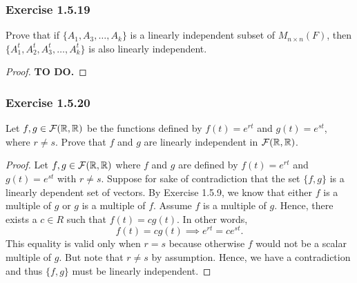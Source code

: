 \subsubsection{Exercise 1.5.19} Prove that if \( \{ A_{1}, A_{3}, \dots, A_{k} \}  \) is a linearly independent subset of \( M_{n \times n }(F) \), then \( \{ A^{t}_{1} , A^{t}_{2} , A^{t}_{3}, \dots, A^{t}_{k } \}  \) is also linearly independent.
\begin{proof}
\textbf{TO DO.}
\end{proof}

\subsubsection{Exercise 1.5.20} Let \( f,g \in \mathcal{F}(\mathbb{R} , \mathbb{R} ) \) be the functions defined by \( f(t) = e^{rt} \) and \( g(t) = e^{s t  } \), where \( r \neq s  \). Prove that \( f  \) and \( g  \) are linearly independent in \( \mathcal{F}(\mathbb{R} , \mathbb{R} ) \).
\begin{proof}
    Let \( f,g \in \mathcal{F}(\mathbb{R} , \mathbb{R} )  \) where \( f  \) and \( g  \) are defined by \( f(t) = e^{rt}  \) and \( g(t) = e^{s t  } \) with \( r \neq  s  \). Suppose for sake of contradiction that the set \( \{ f,g  \}  \) is a linearly dependent set of vectors. By Exercise 1.5.9, we know that either \( f  \) is a multiple of \( g  \) or \( g  \) is a multiple of \( f  \). Assume \( f  \) is a multiple of \( g  \). Hence, there exists a \(  c \in R  \) such that \( f(t) = c g(t ) \). In other words, 
    \[  f(t) = c g(t) \implies e^{rt} = c e^{s t }. \]
     This equality is valid only when \( r = s  \) because otherwise \( f  \) would not be a scalar multiple of \( g  \). But note that \( r \neq s  \) by assumption. Hence, we have a contradiction and thus \( \{ f,g  \}  \) must be linearly independent.
\end{proof}


